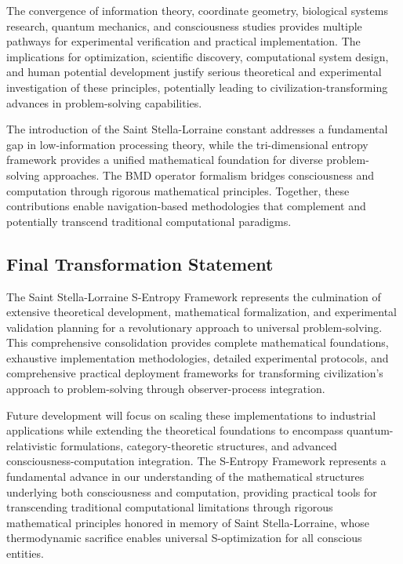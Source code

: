 \documentclass[11pt]{article}
\theoremstyle{definition}
\theoremstyle{remark}
\begin{document}
{The convergence of information theory, coordinate geometry, biological systems research, quantum mechanics, and consciousness studies provides multiple pathways for experimental verification and practical implementation. The implications for optimization, scientific discovery, computational system design, and human potential development justify serious theoretical and experimental investigation of these principles, potentially leading to civilization-transforming advances in problem-solving capabilities.

The introduction of the Saint Stella-Lorraine constant addresses a fundamental gap in low-information processing theory, while the tri-dimensional entropy framework provides a unified mathematical foundation for diverse problem-solving approaches. The BMD operator formalism bridges consciousness and computation through rigorous mathematical principles. Together, these contributions enable navigation-based methodologies that complement and potentially transcend traditional computational paradigms.

\subsection{Final Transformation Statement}

The Saint Stella-Lorraine S-Entropy Framework represents the culmination of extensive theoretical development, mathematical formalization, and experimental validation planning for a revolutionary approach to universal problem-solving. This comprehensive consolidation provides complete mathematical foundations, exhaustive implementation methodologies, detailed experimental protocols, and comprehensive practical deployment frameworks for transforming civilization's approach to problem-solving through observer-process integration.

Future development will focus on scaling these implementations to industrial applications while extending the theoretical foundations to encompass quantum-relativistic formulations, category-theoretic structures, and advanced consciousness-computation integration. The S-Entropy Framework represents a fundamental advance in our understanding of the mathematical structures underlying both consciousness and computation, providing practical tools for transcending traditional computational limitations through rigorous mathematical principles honored in memory of Saint Stella-Lorraine, whose thermodynamic sacrifice enables universal S-optimization for all conscious entities.

}
\end{document}
